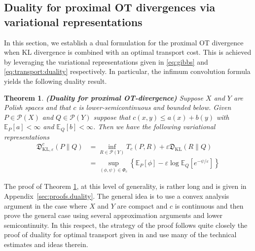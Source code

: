 \documentclass{amsart}
\newtheorem{theorem}{Theorem}[section]
\theoremstyle{definition}
\theoremstyle{remark}
\numberwithin{equation}{section}
\begin{document}
\subsection{Duality for proximal OT divergences via variational representations} \label{sec:dualityproxOT}
In this section, we establish a dual formulation for the proximal OT divergence when KL divergence is combined with an optimal transport cost. This is achieved by leveraging the variational representations given in \eqref{eq:gibbs} and \eqref{eq:transport:duality} respectively. In particular, the infimum convolution formula yields the following duality result. 



\begin{theorem}{\bf(Duality for proximal  OT-divergence)} \label{thm:duality.Polish} 
Suppose $X$ and $Y$ are Polish spaces and that $c$ is lower-semicontinuous and bounded below.  Given  $P\in \mathcal{P}(X)$ and $Q\in \mathcal{P}(Y)$ suppose that $c(x,y)\le a(x)+b(y)$ with $\mathbb{E}_P[a] < \infty$ and $\mathbb{E}_Q[b] < \infty$. Then we have the following variational representations
\begin{equation}\label{eq:OTdivergence:dual}
\begin{aligned}
\mathfrak{D}_{\mathrm{KL},\varepsilon}^{c}(P\|Q)
&= \inf_{R \in \mathcal{P}(Y)} T_c(P,R)+ \varepsilon \mathfrak{D}_{\mathrm{KL}}(R\|Q)
\\
&= \sup_{(\phi, \psi) \in \Phi_c} \left\{ \mathbb{E}_P[\phi] - \varepsilon \log \mathbb{E}_Q[ e^{-\psi/\varepsilon}] \right\}{}
\end{aligned}
\end{equation}
\end{theorem}

The proof of Theorem \ref{thm:duality.Polish}, at this level of generality, is rather long and is given in Appendix~\ref{sec:proofs.duality}.  The general idea is to use a convex analysis argument in the case where $X$ and $Y$ are compact and $c$ is continuous and then prove the general case using several approximation arguments and lower semicontinuity. In this respect, the strategy of the proof follows quite closely the proof of duality for optimal transport given in \cite{Villani2003topics} and use many of the technical estimates and ideas therein. 
\end{document}
